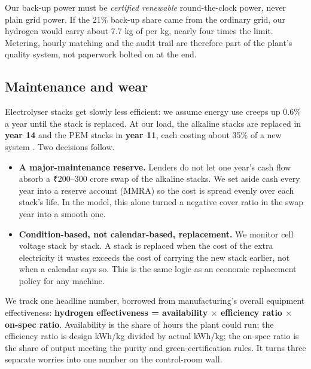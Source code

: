 \begin{verdict}
Our back-up power must be \emph{certified renewable} round-the-clock power, never plain grid power. If the 21\% back-up share came from the ordinary grid, our hydrogen would carry about 7.7 kg of \coo{} per kg, nearly four times the limit. Metering, hourly matching and the audit trail are therefore part of the plant's quality system, not paperwork bolted on at the end. \confH
\end{verdict}

\subsection{Maintenance and wear}
Electrolyser stacks get slowly less efficient: we assume energy use creeps up 0.6\% a year until the stack is replaced. At our load, the alkaline stacks are replaced in \textbf{year 14} and the PEM stacks in \textbf{year 11}, each costing about 35\% of a new system \estd. Two decisions follow.
\begin{itemize}
\item \textbf{A major-maintenance reserve.} Lenders do not let one year's cash flow absorb a ₹200--300 crore swap of the alkaline stacks. We set aside cash every year into a reserve account (MMRA) so the cost is spread evenly over each stack's life. In the model, this alone turned a negative cover ratio in the swap year into a smooth one.
\item \textbf{Condition-based, not calendar-based, replacement.} We monitor cell voltage stack by stack. A stack is replaced when the cost of the extra electricity it wastes exceeds the cost of carrying the new stack earlier, not when a calendar says so. This is the same logic as an economic replacement policy for any machine.
\end{itemize}

\noindent We track one headline number, borrowed from manufacturing's overall equipment effectiveness: \textbf{hydrogen effectiveness = availability $\times$ efficiency ratio $\times$ on-spec ratio}. Availability is the share of hours the plant could run; the efficiency ratio is design kWh/kg divided by actual kWh/kg; the on-spec ratio is the share of output meeting the purity and green-certification rules. It turns three separate worries into one number on the control-room wall.

